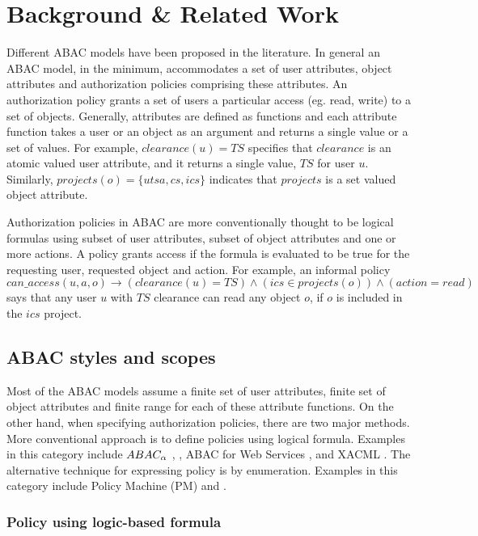 \section{Background \& Related Work}
\label{sec:background}
	Different ABAC models have been proposed in the literature. In general an ABAC model, in the minimum, accommodates a set of user attributes, object attributes and authorization policies comprising these attributes. An authorization policy grants a set of users a particular access (eg. read, write) to a set of objects.  Generally, attributes are defined as functions and each attribute function takes a user or an object as an argument and returns a single value or a set of values. For example, $clearance(u)=TS$ specifies that $clearance$ is an atomic valued user attribute, and it returns a single value, $TS$ for user $u$.  Similarly,  $projects(o)=\{ utsa, cs, ics\}$ indicates that $projects$ is a set valued object attribute.

	Authorization policies in ABAC are more conventionally thought to be logical formulas using subset of user attributes, subset of object attributes and one or more actions. A policy grants access if the formula is evaluated to be true for the requesting user, requested object and action.  For example, an informal policy  $can\_access(u,a,o) \to (clearance(u)=TS) \land (ics \in projects(o)) \land (action=read)$ says that any user $u$ with $TS$ clearance can read any object $o$, if $o$ is included in the $ics$ project.

\subsection{ABAC styles and scopes}
	
	Most of the ABAC models assume a finite set of user attributes, finite set of object attributes and finite range for each of these attribute functions. On the other hand, when specifying authorization policies, there are two major methods. More conventional approach is to define policies using logical formula. Examples in this category include $ABAC_\alpha${} \cite{abacAlpha}, \hgabac{} \cite{hgabac}, ABAC for Web Services \cite{abac-for-web-service}, and XACML \cite{xacml}. The alternative technique for expressing policy is by enumeration. Examples in this category include Policy Machine (PM) \cite{policy-machine} and \twoSortedRBAC{} \cite{two-sorted-rbac}.
	
\subsubsection{Policy using logic-based formula}	


